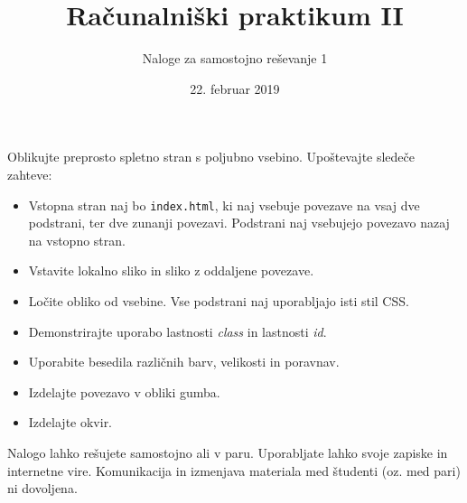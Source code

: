 \documentclass[a4paper,12pt]{article}
\title{Računalniški praktikum II}
\author{Naloge za samostojno reševanje 1}
\date{22. februar 2019}
\begin{document}
\maketitle
\thispagestyle{empty}

\noindent
Oblikujte preprosto spletno stran s poljubno vsebino. Upoštevajte sledeče zahteve:
\begin{itemize}
\item Vstopna stran naj bo \texttt{index.html}, ki naj vsebuje povezave na vsaj dve podstrani, ter dve zunanji povezavi. Podstrani naj vsebujejo povezavo nazaj na vstopno stran.
\item Vstavite lokalno sliko in sliko z oddaljene povezave.
\item Ločite obliko od vsebine. Vse podstrani naj uporabljajo isti stil CSS.
\item Demonstrirajte uporabo lastnosti \emph{class} in lastnosti \emph{id}.
\item Uporabite besedila različnih barv, velikosti in poravnav.
\item Izdelajte povezavo v obliki gumba.
\item Izdelajte okvir.
\end{itemize}
Nalogo lahko rešujete samostojno ali v paru. Uporabljate lahko svoje zapiske in internetne vire. Komunikacija in izmenjava materiala med študenti (oz. med pari) ni dovoljena.
\end{document}
